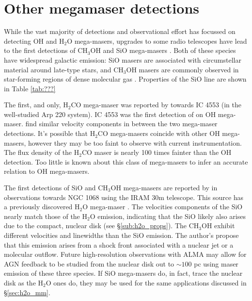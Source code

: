 \section{Other megamaser detections}
\label{sec:other}

While the vast majority of detections and observational effort has focussed on detecting OH and H$_2$O mega-masers, upgrades to some radio telescopes have lead to the first detections of CH$_3$OH and SiO mega-masers \citep{wang2014_SiO_CH3OH, chen_methanol_2015}. Both of these species have widespread galactic emission: SiO masers are associated with circumstellar material around late-type stars, and CH$_3$OH masers are commonly observed in star-forming regions of dense molecular gas \citep{Elitzur_1992}. Properties of the SiO line are shown in Table \ref{tab:???}

The first, and only, H$_2$CO mega-maser was reported by \citet{baan1986} towards IC 4553 (in the well-studied Arp 220 system). IC 4553 was the first detection of on OH mega-maser. \citet{baan1986} find similar velocity components in between the two mega-maser detections. It's possible that H$_2$CO mega-masers coincide with other OH mega-masers, however they may be too faint to observe with current instrumentation. The flux density of the H$_2$CO maser is nearly 100 times fainter than the OH detection. Too little is known about this class of mega-masers to infer an accurate relation to OH mega-masers.

The first detections of SiO and CH$_{3}$OH mega-masers are reported by \citet{wang2014_SiO_CH3OH} in observations towards NGC 1068 using the IRAM 30m telescope. This source has a previously discovered H$_2$O mega-maser \citep{Gallimore_2001}. The velocities components of the SiO nearly match those of the H$_2$O emission, indicating that the SiO likely also arises due to the compact, nuclear disk (see \S\ref{sub:h2o_props}). The CH$_3$OH exhibit different velocities and linewidths than the SiO emission. The author's propose that this emission arises from a shock front associated with a nuclear jet or a molecular outflow. Future high-resolution observations with ALMA may allow for AGN feedback to be studied from the nuclear disk out to $\sim 100$ pc using maser emission of these three species. If SiO mega-masers do, in fact, trace the nuclear disk as the H$_2$O ones do, they may be used for the same applications discussed in \S\ref{sec:h2o_mm}. 

